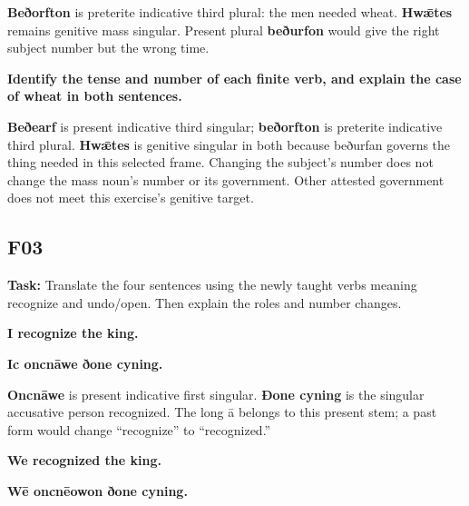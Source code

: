 \textbf{Beðorfton} is preterite indicative third plural: the men needed wheat. \textbf{Hwǣtes} remains genitive mass singular. Present plural \textbf{beðurfon} would give the right subject number but the wrong time.

\textbf{Identify the tense and number of each finite verb, and explain the case of wheat in both sentences.}

\textbf{Beðearf} is present indicative third singular; \textbf{beðorfton} is preterite indicative third plural. \textbf{Hwǣtes} is genitive singular in both because beðurfan governs the thing needed in this selected frame. Changing the subject’s number does not change the mass noun’s number or its government. Other attested government does not meet this exercise’s genitive target.

\subsection*{F03}

\textbf{Task:} Translate the four sentences using the newly taught verbs meaning recognize and undo/\allowbreak{}open. Then explain the roles and number changes.

\par\begin{minipage}{\linewidth}\raggedright
\textbf{I recognize the king.}

\textbf{Ic oncnāwe ðone cyning.}
\end{minipage}\par

\textbf{Oncnāwe} is present indicative first singular. \textbf{Ðone cyning} is the singular accusative person recognized. The long ā belongs to this present stem; a past form would change “recognize” to “recognized.”

\par\begin{minipage}{\linewidth}\raggedright
\textbf{We recognized the king.}

\textbf{Wē oncnēowon ðone cyning.}
\end{minipage}\par

